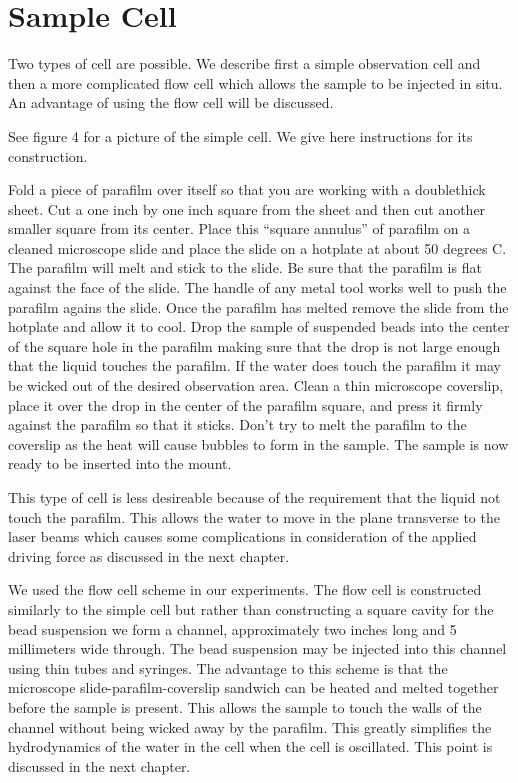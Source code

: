 \documentclass{report}
\begin{document}
\section{Sample Cell}

Two types of cell are possible. We describe first a simple observation cell and then a more complicated flow cell which allows the sample to be injected in situ. An advantage of using the flow cell will be discussed.

See figure 4 for a picture of the simple cell. We give here instructions for its construction.

Fold a piece of parafilm over itself so that you are working with a doublethick sheet. Cut a one inch by one inch square from the sheet and then cut another smaller square from its center. Place this ``square annulus'' of parafilm on a cleaned microscope slide and place the slide on a hotplate at about 50 degrees C. The parafilm will melt and stick to the slide. Be sure that the parafilm is flat against the face of the slide. The handle of any metal tool works well to push the parafilm agains the slide. Once the parafilm has melted remove the slide from the hotplate and allow it to cool. Drop the sample of suspended beads into the center of the square hole in the parafilm making sure that the drop is not large enough that the liquid touches the parafilm. If the water does touch the parafilm it may be wicked out of the desired observation area. Clean a thin microscope coverslip, place it over the drop in the center of the parafilm square, and press it firmly against the parafilm so that it sticks. Don't try to melt the parafilm to the coverslip as the heat will cause bubbles to form in the sample. The sample is now ready to be inserted into the mount.

This type of cell is less desireable because of the requirement that the liquid not touch the parafilm. This allows the water to move in the plane transverse to the laser beams which causes some complications in consideration of the applied driving force as discussed in the next chapter.

We used the flow cell scheme in our experiments. The flow cell is constructed similarly to the simple cell but rather than constructing a square cavity for the bead suspension we form a channel, approximately two inches long and 5 millimeters wide through. The bead suspension may be injected into this channel using thin tubes and syringes. The advantage to this scheme is that the microscope slide-parafilm-coverslip sandwich can be heated and melted together before the sample is present. This allows the sample to touch the walls of the channel without being wicked away by the parafilm. This greatly simplifies the hydrodynamics of the water in the cell when the cell is oscillated. This point is discussed in the next chapter.
\end{document}
